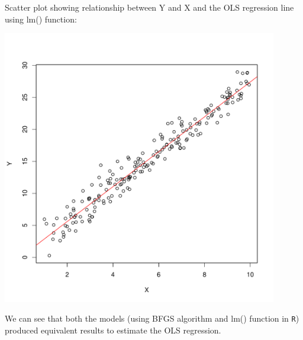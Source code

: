 \documentclass[12pt,letterpaper]{article}
\begin{document}
\noindent Scatter plot showing relationship between Y and X and the OLS regression line using lm() function:
\begin{center}
	\includegraphics[width=12cm]{plot_Y_X_lm.pdf}  
\end{center}
We can see that both the models (using BFGS algorithm and lm() function in \texttt{R}) produced equivalent results to estimate the OLS regression.
\end{document}
